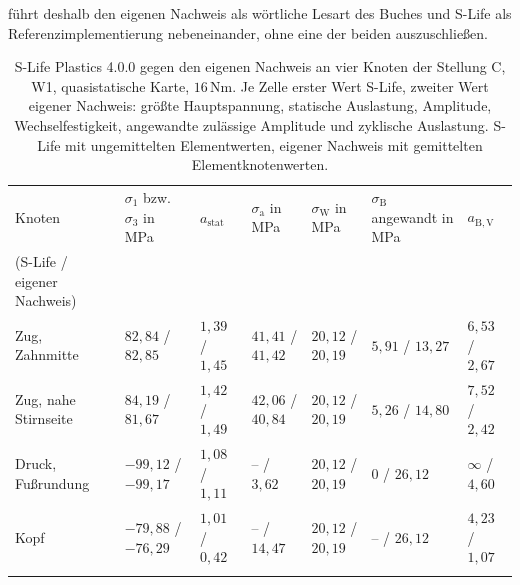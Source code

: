 führt deshalb den eigenen Nachweis als wörtliche Lesart des Buches und S-Life als Referenzimplementierung nebeneinander, ohne eine der beiden auszuschließen.

\begin{table}[htbp]
    \caption{S-Life Plastics 4.0.0 gegen den eigenen Nachweis an vier Knoten der Stellung C, W1, quasistatische Karte, $16$\,Nm. Je Zelle erster Wert S-Life, zweiter Wert eigener Nachweis: größte Hauptspannung, statische Auslastung, Amplitude, Wechselfestigkeit, angewandte zulässige Amplitude und zyklische Auslastung. S-Life mit ungemittelten Elementwerten, eigener Nachweis mit gemittelten Elementknotenwerten.}
    \label{tab:slife_vergleich}
    \centering
    \footnotesize
    \setlength{\tabcolsep}{4pt}
    \begin{tabular}{L{2.6cm}L{1.9cm}L{1.6cm}L{1.9cm}L{1.8cm}L{2.0cm}L{1.6cm}}
        Knoten                      & $\sigma_{\mathrm{1}}$ bzw. $\sigma_{\mathrm{3}}$ in MPa & $a_{\mathrm{stat}}$ & $\sigma_{\mathrm{a}}$ in MPa & $\sigma_{\mathrm{W}}$ in MPa & $\sigma_{\mathrm{B}}$ angewandt in MPa & $a_{\mathrm{B,V}}$  \\
        (S-Life / eigener Nachweis) &                                                         &                     &                              &                              &                                        &                     \\
        \hline
        Zug, Zahnmitte              & $82{,}84$ / $82{,}85$                                   & $1{,}39$ / $1{,}45$ & $41{,}41$ / $41{,}42$        & $20{,}12$ / $20{,}19$        & $5{,}91$ / $13{,}27$                   & $6{,}53$ / $2{,}67$ \\
        \hline
        Zug, nahe Stirnseite        & $84{,}19$ / $81{,}67$                                   & $1{,}42$ / $1{,}49$ & $42{,}06$ / $40{,}84$        & $20{,}12$ / $20{,}19$        & $5{,}26$ / $14{,}80$                   & $7{,}52$ / $2{,}42$ \\
        \hline
        Druck, Fußrundung           & $-99{,}12$ / $-99{,}17$                                 & $1{,}08$ / $1{,}11$ & -- / $3{,}62$                & $20{,}12$ / $20{,}19$        & $0$ / $26{,}12$                        & $\infty$ / $4{,}60$ \\
        \hline
        Kopf                        & $-79{,}88$ / $-76{,}29$                                 & $1{,}01$ / $0{,}42$ & -- / $14{,}47$               & $20{,}12$ / $20{,}19$        & -- / $26{,}12$                         & $4{,}23$ / $1{,}07$ \\
        \hline
    \end{tabular}
\end{table}

